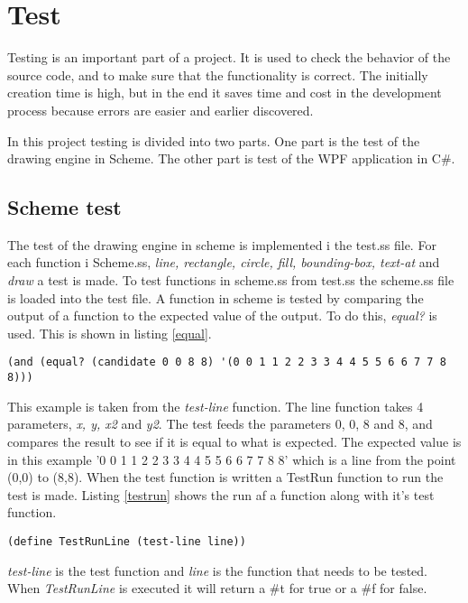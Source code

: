 \chapter{Test}
\label{chp:test}

Testing is an important part of a project. It is used to check the behavior of the source code, and to make sure that the functionality is correct. The initially creation time is high, but in the end it saves time and cost in the development process because errors are easier and earlier discovered.

In this project testing is divided into two parts. One part is the test of the drawing engine in Scheme. The other part is test of the WPF application in C\#.

\section{Scheme test}
The test of the drawing engine in scheme  is implemented i the test.ss file. For each function i Scheme.ss, \emph{line, rectangle, circle, fill, bounding-box, text-at} and \emph{draw} a test is made. To test functions in scheme.ss from test.ss the scheme.ss file is loaded into the test file. A function in scheme is tested by comparing the output of a function to the expected value of the output. To do this, \emph{equal?} is used. This is shown in listing \ref{equal}.

\begin{lstlisting}[caption={Comparison of actual output with the expected output with equal?}, label=equal]
(and (equal? (candidate 0 0 8 8) '(0 0 1 1 2 2 3 3 4 4 5 5 6 6 7 7 8 8)))
\end{lstlisting}

This example is taken from the \emph{test-line} function. The line function takes 4 parameters, \emph{x, y, x2} and \emph{y2}. The test feeds the parameters 0, 0, 8 and 8, and compares the result to see if it is equal to what is expected. The expected value is in this example '0 0 1 1 2 2 3 3 4 4 5 5 6 6 7 7 8 8' which is a line from the point (0,0) to (8,8). When the test function is written a TestRun function to run the test is made. Listing \ref{testrun} shows the run af a function along with it's test function. 

\begin{lstlisting}[caption={TestRunLine}, label=testrun]
(define TestRunLine (test-line line))
\end{lstlisting}

\emph{test-line} is the test function and \emph{line} is the function that needs to be tested. When \emph{TestRunLine} is executed it will return a \#t for true or a \#f for false.

